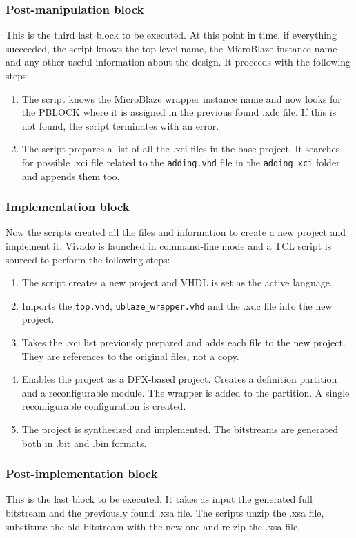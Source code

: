 \subsubsection{Post-manipulation block}
This is the third last block to be executed. At this point in time, if everything succeeded, the script knows the top-level name, the MicroBlaze instance name and any other useful information about the design. It proceeds with the following steps:

\begin{enumerate}
    \item The script knows the MicroBlaze wrapper instance name and now looks for the PBLOCK where it is assigned in the previous found .xdc file. If this is not found, the script terminates with an error.
    \item The script prepares a list of all the .xci files in the base project. It searches for possible .xci file related to the \texttt{adding.vhd} file in the \texttt{adding_xci} folder and appends them too.
\end{enumerate}

\subsubsection{Implementation block}
Now the scripts created all the files and information to create a new project and implement it. Vivado is launched in command-line mode and a TCL script is sourced to perform the following steps:

\begin{enumerate}
    \item The script creates a new project and VHDL is set as the active language.
    \item Imports the \texttt{top.vhd}, \texttt{ublaze\_wrapper.vhd} and the .xdc file into the new project.
    \item Takes the .xci list previously prepared and adds each file to the new project. They are references to the original files, not a copy.
    \item Enables the project as a DFX-based project. Creates a definition partition and a reconfigurable module. The wrapper is added to the partition. A single reconfigurable configuration is created.
    \item The project is synthesized and implemented. The bitstreams are generated both in .bit and .bin formats.
\end{enumerate}

\subsubsection{Post-implementation block}
This is the last block to be executed. It takes as input the generated full bitstream and the previously found .xsa file. The scripts unzip the .xsa file, substitute the old bitstream with the new one and re-zip the .xsa file.


